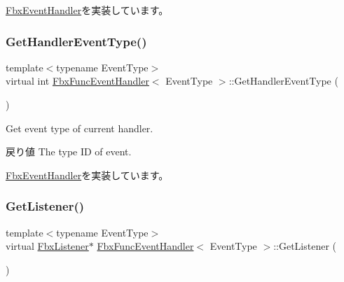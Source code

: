 \hyperlink{class_fbx_event_handler_a46357ba45116a30c8f53c3e5fe9ba2fb}{Fbx\+Event\+Handler}を実装しています。

\mbox{\label{class_fbx_func_event_handler_a0c1a0eaedda70615a684bd96aa72fb97}} 
\subsubsection{\texorpdfstring{Get\+Handler\+Event\+Type()}{GetHandlerEventType()}}
{\footnotesize\ttfamily template$<$typename Event\+Type$>$ \\
virtual int \hyperlink{class_fbx_func_event_handler}{Fbx\+Func\+Event\+Handler}$<$ Event\+Type $>$\+::Get\+Handler\+Event\+Type (\begin{DoxyParamCaption}{ }\end{DoxyParamCaption})\hspace{0.3cm}{\ttfamily [virtual]}}

Get event type of current handler. \begin{DoxyReturn}{戻り値}
The type ID of event. 
\end{DoxyReturn}


\hyperlink{class_fbx_event_handler_a0b42d2b93e63d866975f468a481c9f3c}{Fbx\+Event\+Handler}を実装しています。

\mbox{\label{class_fbx_func_event_handler_af196b87b07e698704615056be5923745}} 
\subsubsection{\texorpdfstring{Get\+Listener()}{GetListener()}}
{\footnotesize\ttfamily template$<$typename Event\+Type$>$ \\
virtual \hyperlink{class_fbx_listener}{Fbx\+Listener}$\ast$ \hyperlink{class_fbx_func_event_handler}{Fbx\+Func\+Event\+Handler}$<$ Event\+Type $>$\+::Get\+Listener (\begin{DoxyParamCaption}{ }\end{DoxyParamCaption})\hspace{0.3cm}{\ttfamily [virtual]}}

